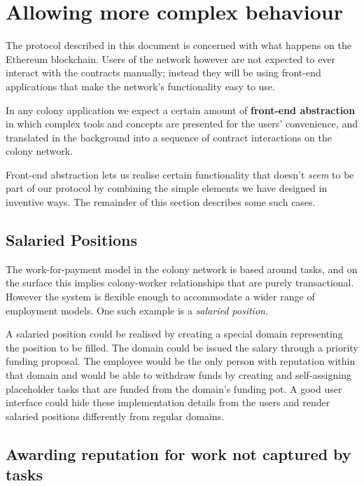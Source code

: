 \section{Allowing more complex behaviour}\label{sec:special-cases}


The protocol described in this document is concerned with what happens on the Ethereum blockchain. Users of the network however are not expected to ever interact with the contracts manually; instead they will be using front-end applications that make the network's functionality easy to use.

In any colony application we expect a certain amount of \textbf{front-end abstraction} in which complex tools and concepts are presented for the users' convenience, and translated in the background into a sequence of contract interactions on the colony network.

Front-end abstraction lets us realise certain functionality that doesn't \emph{seem} to be part of our protocol by combining the simple elements we have designed in inventive ways. The remainder of this section describes some such cases.

\subsection{Salaried Positions}\label{sec:salary}

The work-for-payment model in the colony network is based around tasks, and on the surface this implies colony-worker relationships that are purely transactional. However the system is flexible enough to accommodate a wider range of employment models. One such example is a \emph{salaried position}.

A salaried position could be realised by creating a special domain representing the position to be filled. The domain could be issued the salary through a priority funding proposal. The employee would be the only person with reputation within that domain and would be able to withdraw funds by creating and self-assigning placeholder tasks that are funded from the domain's funding pot. A good user interface could hide these implementation details from the users and render salaried positions differently from regular domains.

\subsection{Awarding reputation for work not captured by tasks}

